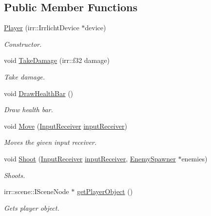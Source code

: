 \subsection*{Public Member Functions}
\begin{DoxyCompactItemize}
\item 
\hyperlink{class_player_ac207dd2957a2e3c4e734a9a074c2321d}{Player} (irr\-::\-Irrlicht\-Device $\ast$device)
\begin{DoxyCompactList}\small\item\em Constructor. \end{DoxyCompactList}\item 
void \hyperlink{class_player_ae9f5a597f15e29673c47abe47c3f1d79}{Take\-Damage} (irr\-::f32 damage)
\begin{DoxyCompactList}\small\item\em Take damage. \end{DoxyCompactList}\item 
void \hyperlink{class_player_aa6cc636d92ca5ccba15a5af2ef7f224a}{Draw\-Health\-Bar} ()
\begin{DoxyCompactList}\small\item\em Draw health bar. \end{DoxyCompactList}\item 
void \hyperlink{class_player_a436296b5c3aca2e448563594fc3eb234}{Move} (\hyperlink{class_input_receiver}{Input\-Receiver} \hyperlink{_game_8cpp_ab1a0fe3a591398ca440c6d1932a73be2}{input\-Receiver})
\begin{DoxyCompactList}\small\item\em Moves the given input receiver. \end{DoxyCompactList}\item 
void \hyperlink{class_player_a24b813efa1554eeb30cd7e3b508bf8fd}{Shoot} (\hyperlink{class_input_receiver}{Input\-Receiver} \hyperlink{_game_8cpp_ab1a0fe3a591398ca440c6d1932a73be2}{input\-Receiver}, \hyperlink{class_enemy_spawner}{Enemy\-Spawner} $\ast$enemies)
\begin{DoxyCompactList}\small\item\em Shoots. \end{DoxyCompactList}\item 
irr\-::scene\-::\-I\-Scene\-Node $\ast$ \hyperlink{class_player_a2914f817c2fe9b34984e6d90e8d5322f}{get\-Player\-Object} ()
\begin{DoxyCompactList}\small\item\em Gets player object. \end{DoxyCompactList}\item 

\end{DoxyCompactItemize}
